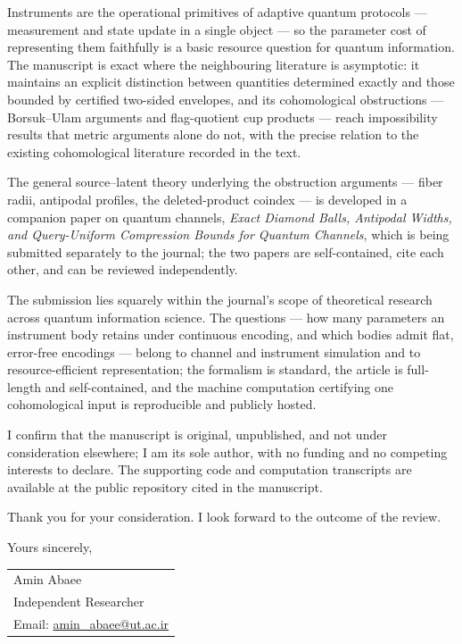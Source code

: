 \documentclass[10pt,a4paper]{article}
\begin{document}
Instruments are the operational primitives of adaptive quantum protocols --- measurement and state update in a single object --- so the parameter cost of representing them faithfully is a basic resource question for quantum information. The manuscript is exact where the neighbouring literature is asymptotic: it maintains an explicit distinction between quantities determined exactly and those bounded by certified two-sided envelopes, and its cohomological obstructions --- Borsuk--Ulam arguments and flag-quotient cup products --- reach impossibility results that metric arguments alone do not, with the precise relation to the existing cohomological literature recorded in the text.

The general source--latent theory underlying the obstruction arguments --- fiber radii, antipodal profiles, the deleted-product coindex --- is developed in a companion paper on quantum channels, \emph{Exact Diamond Balls, Antipodal Widths, and Query-Uniform Compression Bounds for Quantum Channels}, which is being submitted separately to the journal; the two papers are self-contained, cite each other, and can be reviewed independently.

The submission lies squarely within the journal's scope of theoretical research across quantum information science. The questions --- how many parameters an instrument body retains under continuous encoding, and which bodies admit flat, error-free encodings --- belong to channel and instrument simulation and to resource-efficient representation; the formalism is standard, the article is full-length and self-contained, and the machine computation certifying one cohomological input is reproducible and publicly hosted.

I confirm that the manuscript is original, unpublished, and not under consideration elsewhere; I am its sole author, with no funding and no competing interests to declare. The supporting code and computation transcripts are available at the public repository cited in the manuscript.

Thank you for your consideration. I look forward to the outcome of the review.

\vspace{0.8em}

\noindent Yours sincerely,

\vspace{1.4em}

\noindent
\begin{tabular}{@{}l@{}}
Amin Abaee\\
Independent Researcher\\
Email: \href{mailto:amin\_abaee@ut.ac.ir}{amin\_abaee@ut.ac.ir}
\end{tabular}
\end{document}
